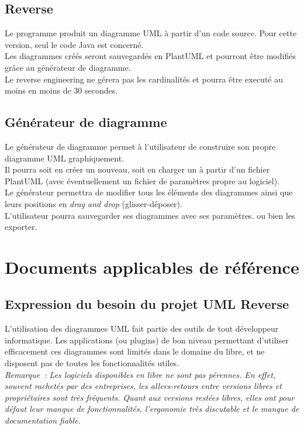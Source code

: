 \documentclass[hidelinks, 10pt,a4paper]{article}
\begin{document}
\subsection{Reverse}
Le programme produit un diagramme UML à partir d’un code source. Pour cette version, seul le code Java est concerné.\\
Les diagrammes créés seront sauvegardés en PlantUML et pourront être modifiés grâce au générateur de diagramme.\\
Le reverse engineering ne gérera pas les cardinalités et pourra être executé au moins en moins de 30 secondes.\\

\subsection{Générateur de diagramme}
Le générateur de diagramme permet à l’utilisateur de construire son propre diagramme UML graphiquement. \\
Il pourra soit en créer un nouveau, soit en charger un à partir d’un fichier PlantUML (avec éventuellement un fichier de paramètres propre au logiciel).\\
Le générateur permettra de modifier tous les éléments des diagrammes ainsi que leurs positions en \textit{drag and drop} (glisser-déposer).\\
L’utilisateur pourra sauvegarder ses diagrammes avec ses paramètres. ou bien les exporter.\\

\section{Documents applicables de référence}
\subsection{Expression du besoin du projet UML Reverse}
L’utilisation des diagrammes UML fait partie des outils de tout développeur informatique. Les applications (ou plugins) de bon niveau permettant d’utiliser efficacement ces diagrammes sont limités dans le domaine du libre, et ne disposent pas de toutes les fonctionnalités utiles.\\
\emph{Remarque~: Les logiciels disponibles en libre ne sont pas pérennes. En effet, souvent rachetés par des entreprises, les allers-retours entre versions libres et propriétaires sont très fréquents. Quant aux versions restées libres, elles ont pour défaut leur manque de fonctionnalités, l’ergonomie très discutable et le manque de documentation fiable.}
\end{document}
